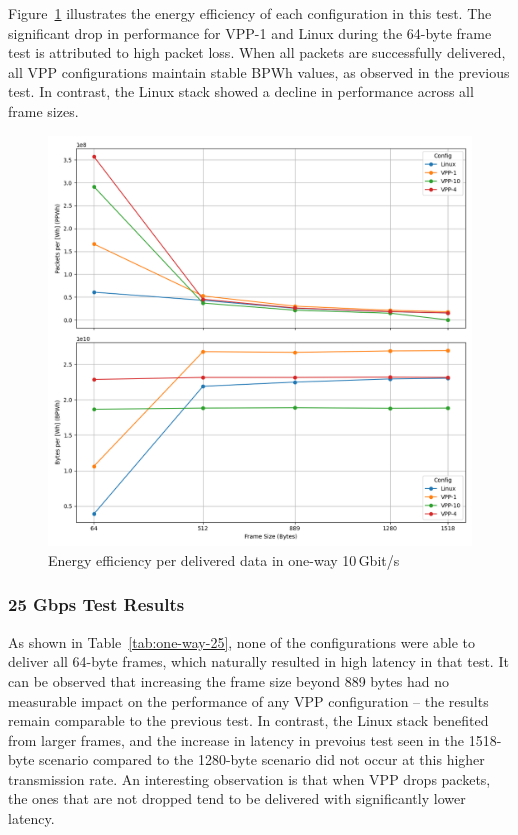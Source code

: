 Figure~\ref{fig:10g} illustrates the energy efficiency of each configuration in this test.
The significant drop in performance for VPP-1 and Linux during the 64-byte frame test is attributed to high packet loss.
When all packets are successfully delivered, all VPP configurations maintain stable BPWh values, as observed in the previous test.
In contrast, the Linux stack showed a decline in performance across all frame sizes.

\begin{figure}[!htbp]
    \centering
    \includegraphics[width=\linewidth]{images/consumption-10g.png}
    \caption{Energy efficiency per delivered data in one-way 10\,Gbit/s}
    \label{fig:10g}
\end{figure}



\subsubsection{25 Gbps Test Results}

As shown in Table~\ref{tab:one-way-25}, none of the configurations were able to deliver all 64-byte frames, which naturally resulted in high latency in that test.
It can be observed that increasing the frame size beyond 889 bytes had no measurable impact on the performance of any VPP configuration -- the results remain comparable to the previous test.
In contrast, the Linux stack benefited from larger frames, and the increase in latency in prevoius test seen in the 1518-byte scenario compared to the 1280-byte scenario 
did not occur at this higher transmission rate.
An interesting observation is that when VPP drops packets, the ones that are not dropped tend to be delivered with significantly lower latency.

